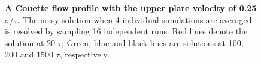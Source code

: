 \documentclass[preprint,12pt]{elsarticle}
\begin{document}
\begin{figure}
\centering
{}
\hskip 1cm
\vskip-0.2cm
\caption[]{\small {\bf A Couette flow profile with the upper plate velocity of 0.25 $\sigma/\tau$.}
The noisy solution when 4 individual simulations are averaged is resolved
by sampling 16 independent runs. Red lines denote the solution at 20 $\tau$;
Green, blue and black lines are solutions at 100, 200 and 1500 $\tau$,
respectively.}
\label{multiple_couette}
\end{figure}
\end{document}
